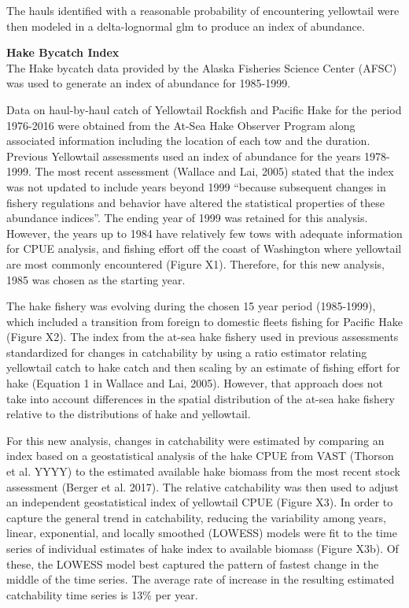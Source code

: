 \documentclass[12pt,]{article}
\begin{document}
The hauls identified with a reasonable probability of encountering
yellowtail were then modeled in a delta-lognormal glm to produce an
index of abundance.

\textbf{Hake Bycatch Index}\\
The Hake bycatch data provided by the Alaska Fisheries Science Center
(AFSC) was used to generate an index of abundance for 1985-1999.

Data on haul-by-haul catch of Yellowtail Rockfish and Pacific Hake for
the period 1976-2016 were obtained from the At-Sea Hake Observer Program
along associated information including the location of each tow and the
duration. Previous Yellowtail assessments used an index of abundance for
the years 1978-1999. The most recent assessment (Wallace and Lai, 2005)
stated that the index was not updated to include years beyond 1999
``because subsequent changes in fishery regulations and behavior have
altered the statistical properties of these abundance indices''. The
ending year of 1999 was retained for this analysis. However, the years
up to 1984 have relatively few tows with adequate information for CPUE
analysis, and fishing effort off the coast of Washington where
yellowtail are most commonly encountered (Figure X1). Therefore, for
this new analysis, 1985 was chosen as the starting year.

The hake fishery was evolving during the chosen 15 year period
(1985-1999), which included a transition from foreign to domestic fleets
fishing for Pacific Hake (Figure X2). The index from the at-sea hake
fishery used in previous assessments standardized for changes in
catchability by using a ratio estimator relating yellowtail catch to
hake catch and then scaling by an estimate of fishing effort for hake
(Equation 1 in Wallace and Lai, 2005). However, that approach does not
take into account differences in the spatial distribution of the at-sea
hake fishery relative to the distributions of hake and yellowtail.

For this new analysis, changes in catchability were estimated by
comparing an index based on a geostatistical analysis of the hake CPUE
from VAST (Thorson et al. YYYY) to the estimated available hake biomass
from the most recent stock assessment (Berger et al. 2017). The relative
catchability was then used to adjust an independent geostatistical index
of yellowtail CPUE (Figure X3). In order to capture the general trend in
catchability, reducing the variability among years, linear, exponential,
and locally smoothed (LOWESS) models were fit to the time series of
individual estimates of hake index to available biomass (Figure X3b). Of
these, the LOWESS model best captured the pattern of fastest change in
the middle of the time series. The average rate of increase in the
resulting estimated catchability time series is 13\% per year.
\end{document}
